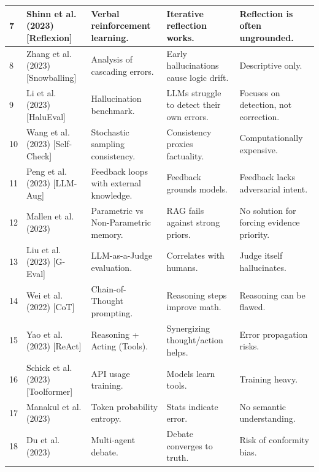 \documentclass[12pt, a4paper]{report}
\begin{document}
\begin{longtable}{|p{0.8cm}|p{3.5cm}|p{4.0cm}|p{3.5cm}|p{2.5cm}|}
    7 & Shinn et al. (2023) [Reflexion] & Verbal reinforcement learning. & Iterative reflection works. & Reflection is often ungrounded. \\ \hline

    8 & Zhang et al. (2023) [Snowballing] & Analysis of cascading errors. & Early hallucinations cause logic drift. & Descriptive only. \\ \hline

    9 & Li et al. (2023) [HaluEval] & Hallucination benchmark. & LLMs struggle to detect their own errors. & Focuses on detection, not correction. \\ \hline

    10 & Wang et al. (2023) [Self-Check] & Stochastic sampling consistency. & Consistency proxies factuality. & Computationally expensive. \\ \hline

    11 & Peng et al. (2023) [LLM-Aug] & Feedback loops with external knowledge. & Feedback grounds models. & Feedback lacks adversarial intent. \\ \hline

    12 & Mallen et al. (2023) & Parametric vs Non-Parametric memory. & RAG fails against strong priors. & No solution for forcing evidence priority. \\ \hline

    13 & Liu et al. (2023) [G-Eval] & LLM-as-a-Judge evaluation. & Correlates with humans. & Judge itself hallucinates. \\ \hline

    14 & Wei et al. (2022) [CoT] & Chain-of-Thought prompting. & Reasoning steps improve math. & Reasoning can be flawed. \\ \hline

    15 & Yao et al. (2023) [ReAct] & Reasoning + Acting (Tools). & Synergizing thought/action helps. & Error propagation risks. \\ \hline

    16 & Schick et al. (2023) [Toolformer] & API usage training. & Models learn tools. & Training heavy. \\ \hline

    17 & Manakul et al. (2023) & Token probability entropy. & Stats indicate error. & No semantic understanding. \\ \hline

    18 & Du et al. (2023) & Multi-agent debate. & Debate converges to truth. & Risk of conformity bias. \\ \hline


\end{longtable}
\end{document}

